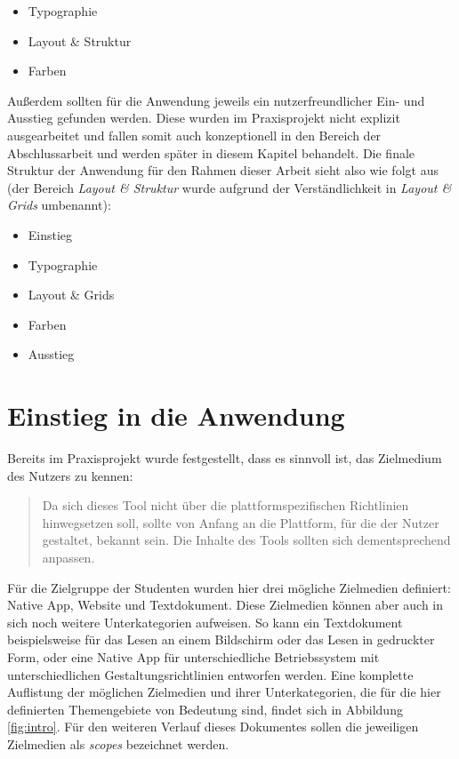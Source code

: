 \begin{itemize}
  \item Typographie
  \item Layout \& Struktur
  \item Farben
\end{itemize}

Außerdem sollten für die Anwendung jeweils ein nutzerfreundlicher Ein- und Ausstieg gefunden werden. Diese wurden im Praxisprojekt nicht explizit ausgearbeitet und fallen somit auch konzeptionell in den Bereich der Abschlussarbeit und werden später in diesem Kapitel behandelt.
Die finale Struktur der Anwendung für den Rahmen dieser Arbeit sieht also wie folgt aus (der Bereich \textit{Layout \& Struktur} wurde aufgrund der Verständlichkeit in \textit{Layout \& Grids} umbenannt):

\begin{itemize}
  \item Einstieg
  \item Typographie
  \item Layout \& Grids
  \item Farben
  \item Ausstieg
\end{itemize}

\section{Einstieg in die Anwendung}
\label{chap:einstieg}
Bereits im Praxisprojekt wurde festgestellt, dass es sinnvoll ist, das Zielmedium des Nutzers zu kennen:

\begin{quote}
  Da sich dieses Tool nicht über die plattformspezifischen Richtlinien hinwegsetzen soll, sollte
von Anfang an die Plattform, für die der Nutzer gestaltet, bekannt sein. Die Inhalte des Tools
sollten sich dementsprechend anpassen. \cite{PoplawskiPP}
\end{quote}

Für die Zielgruppe der Studenten wurden hier drei mögliche Zielmedien definiert: Native App, Website und Textdokument. Diese Zielmedien können aber auch in sich noch weitere Unterkategorien aufweisen. So kann ein Textdokument beispielsweise für das Lesen an einem Bildschirm oder das Lesen in gedruckter Form, oder eine Native App für unterschiedliche Betriebssystem mit unterschiedlichen Gestaltungsrichtlinien entworfen werden. Eine komplette Auflistung der möglichen Zielmedien und ihrer Unterkategorien, die für die hier definierten Themengebiete von Bedeutung sind, findet sich in Abbildung \ref{fig:intro}.
Für den weiteren Verlauf dieses Dokumentes sollen die jeweiligen Zielmedien als \textit{scopes} bezeichnet werden.

